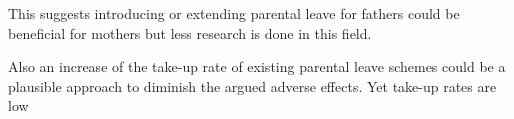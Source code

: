 This suggests introducing or extending parental leave for fathers could be beneficial for mothers but less research is done in this field.



Also an increase of the take-up rate of existing parental leave schemes could be a plausible approach to diminish the argued adverse effects.
Yet take-up rates are low %

